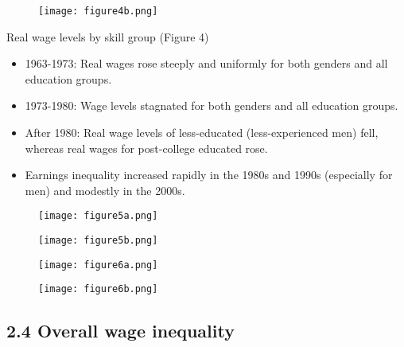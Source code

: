 \documentclass[notes=show]{beamer}
\begin{document}
\newpage
\begin{center}
\begin{figure}
\texttt{[image: figure4b.png]}
\end{figure} 
\end{center}
\newpage

\begin{frame}{Real wage levels by skill group (Figure 4)}
\begin{itemize}
\item 1963-1973: Real wages rose steeply and uniformly for both genders and all education groups. \medskip
\item 1973-1980: Wage levels stagnated for both genders and all education groups. \medskip
\item After 1980: Real wage levels of less-educated (less-experienced men) fell, whereas real wages for post-college educated rose. \medskip
\item Earnings inequality increased rapidly in the 1980s and 1990s (especially for men) and modestly in the 2000s.
\end{itemize}
\end{frame}

\newpage
\begin{center}
\begin{figure}
\texttt{[image: figure5a.png]}
\end{figure} 
\end{center}
\newpage

\newpage
\begin{center}
\begin{figure}
\texttt{[image: figure5b.png]}
\end{figure} 
\end{center}
\newpage
\newpage
\begin{center}
\begin{figure}
\texttt{[image: figure6a.png]}
\end{figure} 
\end{center}
\newpage

\newpage
\begin{center}
\begin{figure}
\texttt{[image: figure6b.png]}
\end{figure} 
\end{center}
\newpage

\subsection{2.4 Overall wage inequality}
\end{document}

